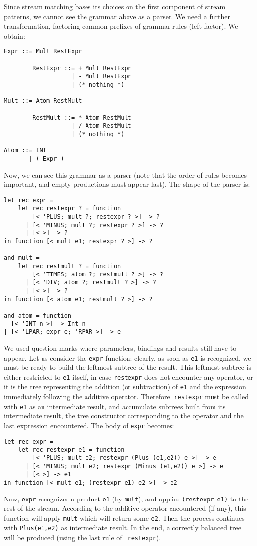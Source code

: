 Since stream matching bases its choices on the first component of
stream patterns, we cannot see the grammar above as a parser. We need
a further transformation, factoring common prefixes of grammar rules
(left-factor). We obtain:
\begin{verbatim}
Expr ::= Mult RestExpr

        RestExpr ::= + Mult RestExpr
                   | - Mult RestExpr
                   | (* nothing *)

Mult ::= Atom RestMult

        RestMult ::= * Atom RestMult
                   | / Atom RestMult
                   | (* nothing *)

Atom ::= INT
       | ( Expr )
\end{verbatim}
Now, we can see this grammar as a parser (note that the order of rules
becomes important, and empty productions must appear last). The shape
of the parser is:
\begin{verbatim}
let rec expr =
    let rec restexpr ? = function
        [< 'PLUS; mult ?; restexpr ? >] -> ?
      | [< 'MINUS; mult ?; restexpr ? >] -> ?
      | [< >] -> ?
in function [< mult e1; restexpr ? >] -> ?

and mult =
    let rec restmult ? = function
        [< 'TIMES; atom ?; restmult ? >] -> ?
      | [< 'DIV; atom ?; restmult ? >] -> ?
      | [< >] -> ?
in function [< atom e1; restmult ? >] -> ?

and atom = function
  [< 'INT n >] -> Int n
| [< 'LPAR; expr e; 'RPAR >] -> e
\end{verbatim}
We used question marks where parameters, bindings and results still
have to appear.  Let us consider the {\tt expr} function: clearly, as
soon as {\tt e1} is recognized, we must be ready to build the leftmost
subtree of the result. This leftmost subtree is either restricted to
{\tt e1} itself, in case {\tt restexpr} does not encounter any
operator, or it is the tree representing the addition (or subtraction)
of {\tt e1} and the expression immediately following the additive
operator. Therefore, {\tt restexpr} must be called with {\tt e1} as an
intermediate result, and accumulate subtrees built from its
intermediate result, the tree constructor corresponding to the
operator and the last expression encountered. The body of {\tt expr}
becomes:
\begin{verbatim}
let rec expr =
    let rec restexpr e1 = function
        [< 'PLUS; mult e2; restexpr (Plus (e1,e2)) e >] -> e
      | [< 'MINUS; mult e2; restexpr (Minus (e1,e2)) e >] -> e
      | [< >] -> e1
in function [< mult e1; (restexpr e1) e2 >] -> e2
\end{verbatim}
Now, {\tt expr} recognizes a product {\tt e1} (by {\tt mult}), and
applies \verb|(restexpr e1)| to the rest of the stream. According to
the additive operator encountered (if any), this function will apply
{\tt mult} which will return some {\tt e2}. Then the process continues
with \verb|Plus(e1,e2)| as intermediate result. In the end, a
correctly balanced tree will be produced (using the last rule of {\tt
restexpr}).


